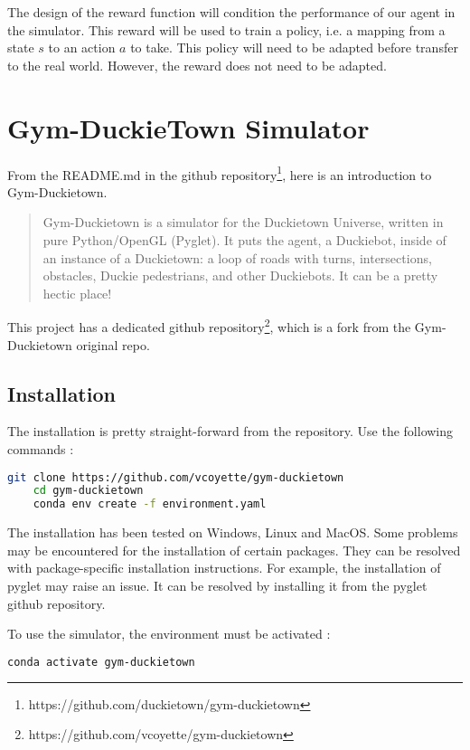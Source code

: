 \documentclass[12pt]{article}
\begin{document}
The design of the reward function will condition the performance of our agent in the simulator. This reward will be used to train a policy, i.e. a mapping from a state $s$ to an action $a$ to take. This policy will need to be adapted before transfer to the real world. However, the reward does not need to be adapted. 

\section{Gym-DuckieTown Simulator}

From the README.md in the github repository\footnote{https://github.com/duckietown/gym-duckietown}, here is an introduction to Gym-Duckietown. 

 \begin{quotation}
Gym-Duckietown is a simulator for the Duckietown Universe, written in pure Python/OpenGL (Pyglet). It puts the agent, a Duckiebot, inside of an instance of a Duckietown: a loop of roads with turns, intersections, obstacles, Duckie pedestrians, and other Duckiebots. It can be a pretty hectic place!
 \end{quotation}

 This project has a dedicated github repository\footnote{https://github.com/vcoyette/gym-duckietown}, which is a fork from the Gym-Duckietown original repo.

\subsection{Installation}
The installation is pretty straight-forward from the repository. Use the following commands :

\begin{lstlisting}[language=bash]
    git clone https://github.com/vcoyette/gym-duckietown
    cd gym-duckietown
    conda env create -f environment.yaml
\end{lstlisting}

The installation has been tested on Windows, Linux and MacOS. Some problems may be encountered for the installation of certain packages. They can be resolved with package-specific installation instructions. 
For example, the installation of pyglet may raise an issue. It can be resolved by installing it from the pyglet github repository. 

To use the simulator, the environment must be activated :
 
\begin{lstlisting}[language=bash]
    conda activate gym-duckietown
\end{lstlisting}
\end{document}
